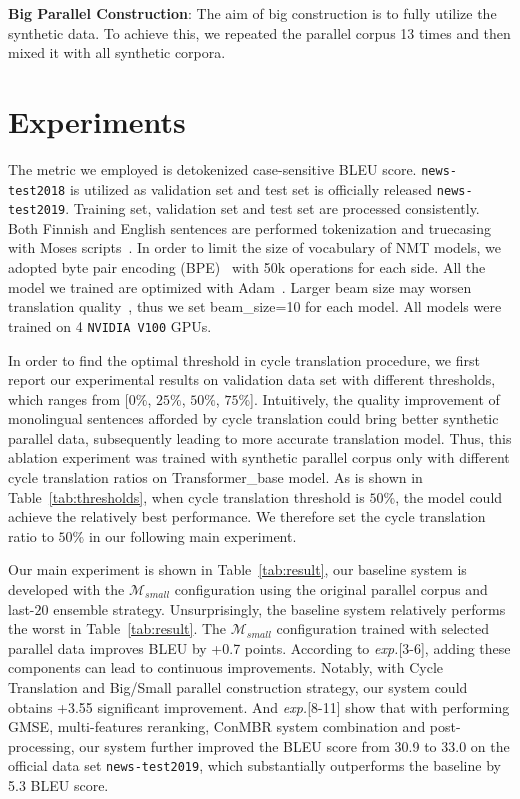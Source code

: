 \documentclass[11pt,a4paper]{article}
\begin{document}
\textbf{Big Parallel Construction}:
The aim of big construction is to fully utilize the synthetic data. To achieve this, we repeated the parallel corpus 13 times and then mixed it with all synthetic corpora.



\section{Experiments}
\label{sec:exp}
The metric we employed is detokenized case-sensitive BLEU score. \verb|news-test2018| is utilized as validation set and test set is officially released \verb|news-test2019|. Training set, validation set and test set are processed consistently. Both Finnish and English sentences are performed tokenization and truecasing with Moses scripts~\cite{Koehn2007MosesOS}. In order to limit the size of vocabulary of NMT models, we adopted byte pair encoding (BPE)~\cite{sennrich-etal-2016-edinburgh} with 50k operations for each side. All the model we trained are optimized with Adam~\cite{kingma2014adam}. Larger beam size may worsen translation quality~\cite{koehn-knowles-2017-six}, thus we set beam\_size=10 for each model. All models were trained on 4 \verb|NVIDIA V100| GPUs.

In order to find the optimal threshold in cycle translation procedure, we first report our experimental results on validation data set with different thresholds, which ranges from [$0\%$, $25\%$, $50\%$, $75\%$]. Intuitively, the quality improvement of monolingual sentences afforded by cycle translation could bring better synthetic parallel data, subsequently leading to more accurate translation model. Thus, this ablation experiment was trained with synthetic parallel corpus only with different cycle translation ratios on Transformer\_base model. As is shown in Table~\ref{tab:thresholds}, when cycle translation threshold is $50\%$, the model could achieve the relatively best performance. We therefore set the cycle translation ratio to $50\%$ in our following main experiment.


Our main experiment is shown in Table~\ref{tab:result}, our baseline system is developed with the $\mathcal{M}_{small}$ configuration using the original parallel corpus and last-$20$ ensemble strategy. Unsurprisingly, the baseline system relatively performs the worst in Table~\ref{tab:result}. The $\mathcal{M}_{small}$ configuration trained with selected parallel data improves BLEU by +0.7 points. According to \textit{exp.}[3-6], adding these components can lead to continuous improvements. Notably, with Cycle Translation and Big/Small parallel construction strategy, our system could obtains +3.55 significant improvement. And \textit{exp.}[8-11] show that with performing GMSE, multi-features reranking, ConMBR system combination and post-processing, our system further improved the BLEU score from 30.9 to 33.0 on the official data set \verb|news-test2019|, which substantially outperforms the baseline by 5.3 BLEU score.
\end{document}
